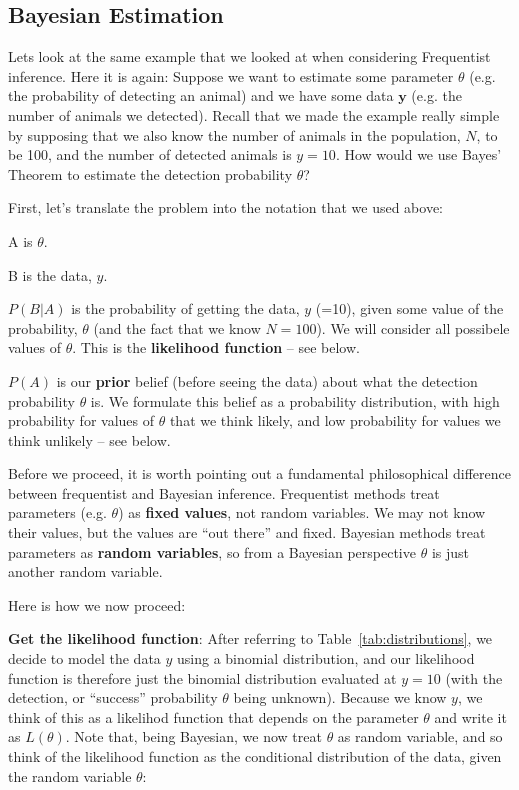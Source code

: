 \subsection{Bayesian Estimation}

Lets look at the same example that we looked at when considering Frequentist inference. Here it is again: Suppose we want to estimate some parameter $\theta$ (e.g. the probability of detecting an animal) and we have some data $\bm{y}$ (e.g. the number of animals we detected). Recall that we made the example really simple  by supposing that we also know the number of animals in the population, $N$, to be 100, and the number of detected animals is $y=10$. How would we use Bayes' Theorem to estimate the detection probability $\theta$?

First, let's translate the problem into the notation that we used above:

\bi
\item A is $\theta$.
\item B is the data, $y$.
\item $P(B|A)$ is the probability of getting the data, $y$ (=10), given some value of the probability, $\theta$ (and the fact that we know $N=100$). We will consider all possibele values of $\theta$. This is the \textbf{likelihood function} -- see below.
\item $P(A)$ is our \textbf{prior} belief (before seeing the data) about what the detection probability $\theta$ is. We formulate this belief as a probability distribution, with high probability for values of $\theta$ that we think likely, and low probability for values we think unlikely -- see below.
\ei

Before we proceed, it is worth pointing out a fundamental philosophical difference between frequentist and Bayesian inference. Frequentist methods treat parameters (e.g. $\theta$) as \textbf{fixed values}, not random variables. We may not know their values, but the values are ``out there'' and fixed. Bayesian methods treat parameters as \textbf{random variables}, so from a Bayesian perspective $\theta$ is just another random variable. 

Here is how we now proceed:

\ben

\item \textbf{Get the likelihood function}: After referring to Table~\ref{tab:distributions}, we decide to model the data $y$ using a binomial distribution, and our likelihood function is therefore just the binomial distribution evaluated at $y=10$ (with the detection, or ``success'' probability $\theta$ being unknown). Because we know $y$, we think of this as a likelihod function that depends on the parameter $\theta$ and write it as $L(\theta)$. Note that, being Bayesian, we now treat $\theta$ as  random variable, and so think of the likelihood function as the conditional distribution of the data, given the random variable $\theta$:

